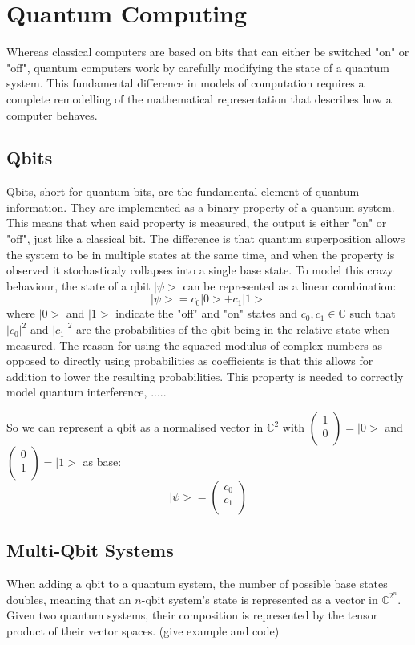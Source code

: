 % 
\chapter{Quantum Computing}
Whereas classical computers are based on bits that can either be switched "on" or "off", quantum computers work by carefully modifying the state of a quantum system. This fundamental difference in models of computation requires a complete remodelling of the mathematical representation that describes how a computer behaves.

\section{Qbits}
Qbits, short for quantum bits, are the fundamental element of quantum information. They are implemented as a binary property of a quantum system. This means that when said property is measured, the output is either "on" or "off", just like a classical bit. The difference is that quantum superposition allows the system to be in multiple states at the same time, and when the property is observed it stochasticaly collapses into a single base state. To model this crazy behaviour, the state of a qbit $ |\psi> $ can be represented as a linear combination:
\[
|\psi> = c_0 |0> + c_1 |1>
\]
where $ |0> $ and $ |1> $ indicate the "off" and "on" states and $ c_0, c_1 \in \mathbb{C} $ such that $ |c_0|^2 $ and $ |c_1|^2 $ are the probabilities of the qbit being in the relative state when measured. The reason for using the squared modulus of complex numbers as opposed to directly using probabilities as coefficients is that this allows for addition to lower the resulting probabilities. This property is needed to correctly model quantum interference, .....

So we can represent a qbit as a normalised vector in $ \mathbb{C}^2 $ with $ \begin{pmatrix}
1\\
0\\
\end{pmatrix} = |0> $ and $ \begin{pmatrix}
0\\
1\\
\end{pmatrix} = |1> $ as base:
\[
|\psi> = \begin{pmatrix}
c_0\\
c_1\\
\end{pmatrix}
\]
\section{Multi-Qbit Systems}
When adding a qbit to a quantum system, the number of possible base states doubles, meaning that an $ n $-qbit system's state is represented as a vector in $ \mathbb{C}^{2^n} $. Given two quantum systems, their composition is represented by the tensor product of their vector spaces. (give example and code)


